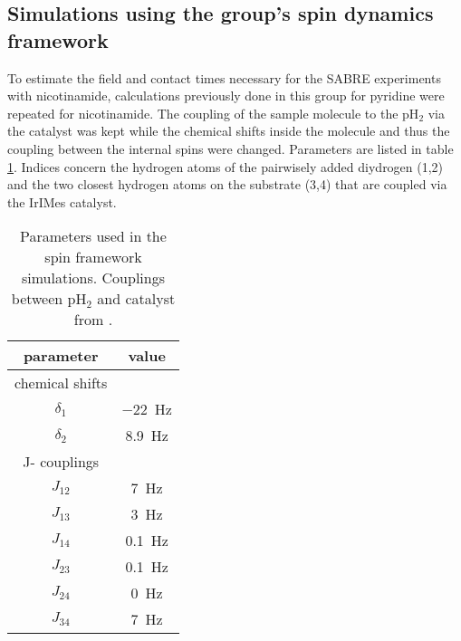     \subsection{Simulations using the group's spin dynamics framework}
    To estimate the field and contact times necessary for the SABRE experiments with nicotinamide, calculations previously done in this group for pyridine \cite{knecht_spin_2014} were repeated for nicotinamide. The coupling of the sample molecule to the pH$_2$ via the catalyst was kept \cite{green_theory_2012-1} while the chemical shifts inside the molecule and thus the coupling between the internal spins were changed. Parameters are listed in table \ref{table:simulations:spinFrameworkParameters}. Indices concern the hydrogen atoms of the pairwisely added diydrogen (1,2) and the two closest hydrogen atoms on the substrate (3,4) that are coupled via the IrIMes catalyst.
        \begin{table}
        \centering
            \begin{tabular}{|c|c|}
                \hline
                parameter & value\\
                \hline
                chemical shifts & \\
                \hline
                $\delta_1$ & \SI{-22}{\hertz}\\
                $\delta_2$ & \SI{8.9}{\hertz}\\
                \hline
                J- couplings & \\
                \hline
                $J_{12}$ & \SI{7}{\hertz}\\
                $J_{13}$ & \SI{3}{\hertz}\\
                $J_{14}$ & \SI{0.1}{\hertz}\\
                $J_{23}$ & \SI{0.1}{\hertz}\\
                $J_{24}$ & \SI{0}{\hertz}\\
                $J_{34}$ & \SI{7}{\hertz}\\
                \hline
            \end{tabular}
            \caption[Spin framework parameters]{Parameters used in the spin framework simulations. Couplings between pH$_2$ and catalyst from \cite{green_theory_2012-1}. }
            \label{table:simulations:spinFrameworkParameters}
        \end{table}
